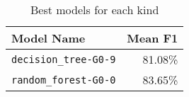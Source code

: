\begin{table}[H]
\centering
\capstart
\begin{tabularx}{0.48\textwidth}{|X|r|}
\hline
Model Name & Mean F1 \\
\hline
\texttt{decision\_tree-G0-9} & 81.08\% \\
\texttt{random\_forest-G0-0} & 83.65\% \\
\hline
\end{tabularx}
\caption{Best models for each kind}
\label{tab:best_model_per_kind}

\end{table}
